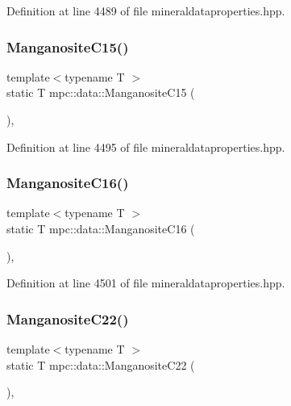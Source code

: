Definition at line 4489 of file mineraldataproperties.\+hpp.

\mbox{\label{namespacempc_1_1data_a6e0b9baae5494f7b6b742f7cd1279638}} 
\subsubsection{\texorpdfstring{Manganosite\+C15()}{ManganositeC15()}}
{\footnotesize\ttfamily template$<$typename T $>$ \\
static T mpc\+::data\+::\+Manganosite\+C15 (\begin{DoxyParamCaption}{ }\end{DoxyParamCaption})\hspace{0.3cm}{\ttfamily [inline]}, {\ttfamily [static]}}



Definition at line 4495 of file mineraldataproperties.\+hpp.

\mbox{\label{namespacempc_1_1data_a89b845b12ea4ab0e93bad4527d228472}} 
\subsubsection{\texorpdfstring{Manganosite\+C16()}{ManganositeC16()}}
{\footnotesize\ttfamily template$<$typename T $>$ \\
static T mpc\+::data\+::\+Manganosite\+C16 (\begin{DoxyParamCaption}{ }\end{DoxyParamCaption})\hspace{0.3cm}{\ttfamily [inline]}, {\ttfamily [static]}}



Definition at line 4501 of file mineraldataproperties.\+hpp.

\mbox{\label{namespacempc_1_1data_a0f742efd9f01b8ec83dd1380c7dee8b2}} 
\subsubsection{\texorpdfstring{Manganosite\+C22()}{ManganositeC22()}}
{\footnotesize\ttfamily template$<$typename T $>$ \\
static T mpc\+::data\+::\+Manganosite\+C22 (\begin{DoxyParamCaption}{ }\end{DoxyParamCaption})\hspace{0.3cm}{\ttfamily [inline]}, {\ttfamily [static]}}



